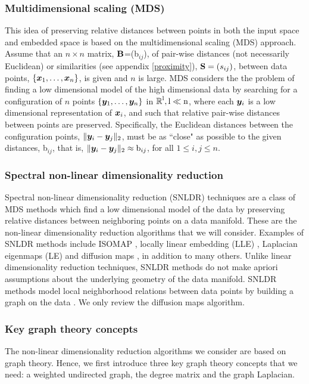 \subsubsection{Multidimensional scaling (MDS)}
This idea of preserving relative distances between points in both the input space and embedded space is based on the multidimensional scaling (MDS) approach. Assume that an $n\times n$ matrix, $\textbf{B}$=(b$_{ij}$), of pair-wise distances (not necessarily Euclidean) or similarities (see appendix \ref{proximity}), $\textbf{S} = (s_{ij})$, between data points, $\{\boldsymbol{x}_{1}, \ldots, \boldsymbol{x}_{n} \}$, is given and $n$ is large.
MDS \cite{CoxT2000, MardiaK.V1979Ma} considers the the problem of finding a low dimensional model of the high dimensional data by searching for a configuration of $n$ points $\{\boldsymbol{y}_{1}, \ldots, \boldsymbol{y}_{n} \}$ in $\operatorname{\mathbb{R}}^{\text{l}}, \text{l} \ll \text{n}$, where each $\boldsymbol{y}_{i}$ is a low dimensional representation of $\boldsymbol{x}_{i}$, and such that relative pair-wise distances between points are preserved. Specifically, the Euclidean distances between the configuration points, $\lVert\boldsymbol{y}_{i} - \boldsymbol{y}_{j}\rVert_{2}$, must be as ``close" as possible to  the given distances, b$_{ij}$, that is, $\lVert\boldsymbol{y}_{i} - \boldsymbol{y}_{j}\rVert_{2} \approx \text{b}_{ij}$, for all $1 \leq i, j \leq n$.

\subsubsection{Spectral non-linear dimensionality reduction}
Spectral non-linear dimensionality reduction (SNLDR) techniques are a 
class of MDS methods which find a low dimensional model of the data by preserving relative distances between neighboring points on a data manifold. These are the non-linear dimensionality
reduction algorithms that we will consider. Examples of SNLDR methods include ISOMAP \cite{TenenbaumJB2000Aggf}, locally linear embedding (LLE)  \cite{roweis2000nonlinear}, Laplacian eigenmaps (LE) \cite{belkin2003laplacian} and diffusion maps \cite{coifman2006diffusion}, in addition to many others. Unlike linear dimensionality reduction techniques, SNLDR methods do not make apriori assumptions about the underlying geometry of the data manifold.
SNLDR methods model local neighborhood relations between data points by building a graph on the data  \cite{Luxburg2007}. We only review the diffusion maps algorithm.


\subsubsection{Key graph theory concepts}
The non-linear dimensionality reduction algorithms we consider are based on graph theory. Hence, we first introduce three key graph theory concepts that we need: a weighted undirected graph, the degree matrix and the graph Laplacian.\\

